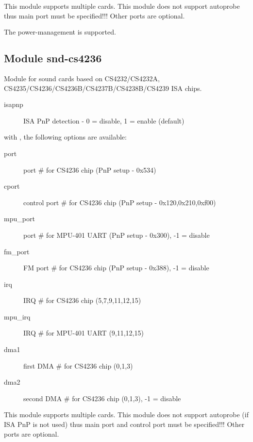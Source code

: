 \documentclass[a4paper,8pt,english]{sphinxmanual}
\begin{document}
This module supports multiple cards. This module does not support autoprobe
thus main port must be specified!!! Other ports are optional.

The power-management is supported.


\subsection{Module snd-cs4236}
\label{sound/alsa-configuration:module-snd-cs4236}
Module for sound cards based on CS4232/CS4232A,
CS4235/CS4236/CS4236B/CS4237B/CS4238B/CS4239 ISA chips.
\begin{description}
\item[{isapnp}] \leavevmode
ISA PnP detection - 0 = disable, 1 = enable (default)

\end{description}

with , the following options are available:
\begin{description}
\item[{port}] \leavevmode
port \# for CS4236 chip (PnP setup - 0x534)

\item[{cport}] \leavevmode
control port \# for CS4236 chip (PnP setup - 0x120,0x210,0xf00)

\item[{mpu\_port}] \leavevmode
port \# for MPU-401 UART (PnP setup - 0x300), -1 = disable

\item[{fm\_port}] \leavevmode
FM port \# for CS4236 chip (PnP setup - 0x388), -1 = disable

\item[{irq}] \leavevmode
IRQ \# for CS4236 chip (5,7,9,11,12,15)

\item[{mpu\_irq}] \leavevmode
IRQ \# for MPU-401 UART (9,11,12,15)

\item[{dma1}] \leavevmode
first DMA \# for CS4236 chip (0,1,3)

\item[{dma2}] \leavevmode
second DMA \# for CS4236 chip (0,1,3), -1 = disable

\end{description}

This module supports multiple cards. This module does not support autoprobe
(if ISA PnP is not used) thus main port and control port must be
specified!!! Other ports are optional.
\end{document}
